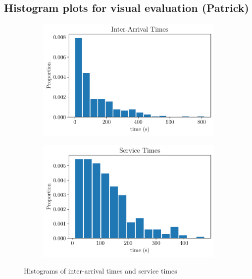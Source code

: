 \documentclass{article}
\begin{document}
\subsection{Histogram plots for visual evaluation (Patrick)}

\begin{figure}[H]
    \centering
    \begin{subfigure}[b]{0.45\textwidth}
        \centering
        \includegraphics[width=\textwidth]{fig1.pdf}
        \caption{}
        \label{fig:img1}
    \end{subfigure}
    \hfill
    \begin{subfigure}[b]{0.45\textwidth}
        \centering
        \includegraphics[width=\textwidth]{fig2.pdf}
        \caption{}
        \label{fig:img2}
    \end{subfigure}

    \caption{Histograms of inter-arrival times and service times}
    \label{fig:two-figs}
\end{figure}
\end{document}
